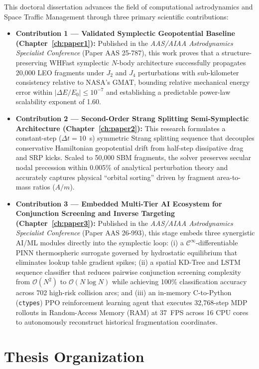 This doctoral dissertation advances the field of computational astrodynamics and Space Traffic Management through three primary scientific contributions:
\begin{itemize}
    \item \textbf{Contribution 1 --- Validated Symplectic Geopotential Baseline (Chapter~\ref{ch:paper1}):} Published in the \textit{AAS/AIAA Astrodynamics Specialist Conference} (Paper AAS 25-787), this work proves that a structure-preserving WHFast symplectic $N$-body architecture successfully propagates 20,000 LEO fragments under $J_2$ and $J_4$ perturbations with sub-kilometer consistency relative to NASA's GMAT, bounding relative mechanical energy error within $|\Delta E/E_0| \le 10^{-7}$ and establishing a predictable power-law scalability exponent of 1.60.
    \item \textbf{Contribution 2 --- Second-Order Strang Splitting Semi-Symplectic Architecture (Chapter~\ref{ch:paper2}):} This research formulates a constant-step ($\Delta t = 10$~s) symmetric Strang splitting sequence that decouples conservative Hamiltonian geopotential drift from half-step dissipative drag and SRP kicks. Scaled to 50,000 SBM fragments, the solver preserves secular nodal precession within 0.005\% of analytical perturbation theory and accurately captures physical ``orbital sorting'' driven by fragment area-to-mass ratios ($A/m$).
    \item \textbf{Contribution 3 --- Embedded Multi-Tier AI Ecosystem for Conjunction Screening and Inverse Targeting (Chapter~\ref{ch:paper3}):} Published in the \textit{AAS/AIAA Astrodynamics Specialist Conference} (Paper AAS 26-993), this stage embeds three synergistic AI/ML modules directly into the symplectic loop: (i) a $\mathcal{C}^\infty$-differentiable PINN thermospheric surrogate governed by hydrostatic equilibrium that eliminates lookup table gradient spikes; (ii) a spatial KD-Tree and LSTM sequence classifier that reduces pairwise conjunction screening complexity from $\mathcal{O}(N^2)$ to $\mathcal{O}(N \log N)$ while achieving 100\% classification accuracy across 702 high-risk collision arcs; and (iii) an in-memory C-to-Python (\texttt{ctypes}) PPO reinforcement learning agent that executes 32,768-step MDP rollouts in Random-Access Memory (RAM) at 37~FPS across 16 CPU cores to autonomously reconstruct historical fragmentation coordinates.
\end{itemize}

\section{Thesis Organization}
\label{sec:organization}


